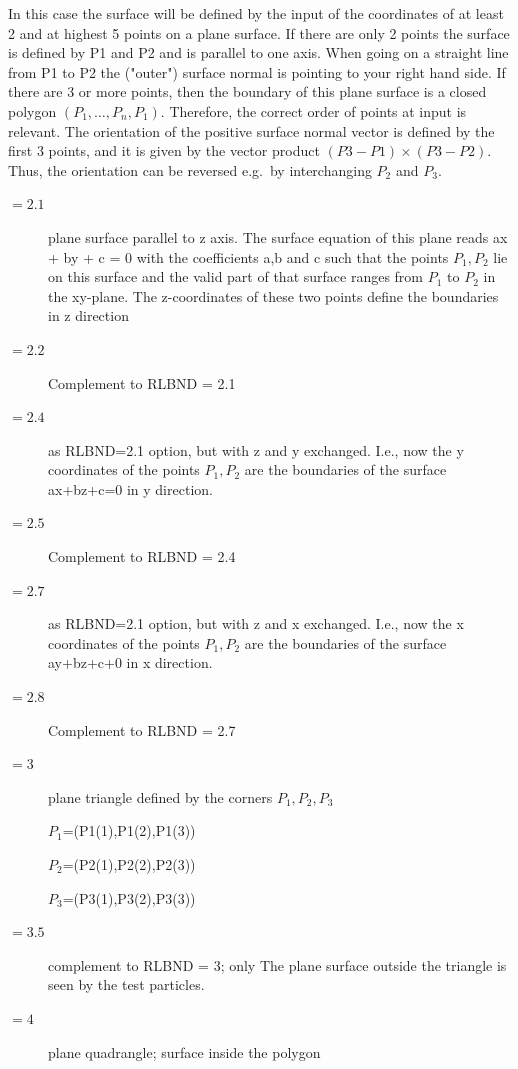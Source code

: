 \begin{description}
        In this case the surface will be defined by the input of the coordinates of at
        least 2 and at highest 5 points on a plane surface.
        If there are only 2 points the surface is defined by P1 and P2 and is parallel to
        one axis. When going on a straight line from P1 to P2 the ("outer") surface normal is pointing
        to your right hand side.
        If there are 3 or more points, then the boundary of this plane surface is a
        closed polygon $(P_1, \dots, P_n, P_1)$.
        Therefore, the correct order of points at input is relevant.
        The orientation of the positive surface normal vector is defined by the first 3
        points, and it is given by the vector product $(P3 - P1) \times (P3 - P2)$.
        Thus, the orientation can be reversed e.g.\ by interchanging $P_2$ and $P_3$.
        \begin{description}
          \item[$= 2.1$] plane surface parallel to z axis.
                The surface equation of this plane reads ax + by + c = 0 with the coefficients
                a,b and c such that the points $P_1, P_2$ lie on this surface and the valid
                part of that surface ranges from $P_1$ to $P_2$ in the xy-plane.
                The z-coordinates of these two points define the boundaries in z direction
          \item[$= 2.2$] Complement to RLBND = 2.1
          \item[$= 2.4$] as RLBND=2.1 option,
                but with z and y exchanged.
                I.e., now the y coordinates of the points $P_1, P_2$ are the boundaries of the
                surface ax+bz+c=0 in y direction.
          \item[$= 2.5$] Complement to RLBND = 2.4
          \item[$= 2.7$] as RLBND=2.1 option,
                but with z and x exchanged.
                I.e., now the x coordinates of the points $P_1, P_2$ are the boundaries of the
                surface ay+bz+c+0 in x direction.
          \item[$= 2.8$] Complement to RLBND = 2.7
          \item[$= 3$] plane triangle defined by
                the corners $P_1, P_2, P_3$ 

                $P_1$=(P1(1),P1(2),P1(3)) 

                $P_2$=(P2(1),P2(2),P2(3)) 

                $P_3$=(P3(1),P3(2),P3(3))
          \item[$= 3.5$] complement to RLBND = 3; only The
                plane surface outside the triangle is seen by the test particles.
          \item[$= 4$] plane quadrangle; surface inside the polygon 


\end{description}
\end{description}

